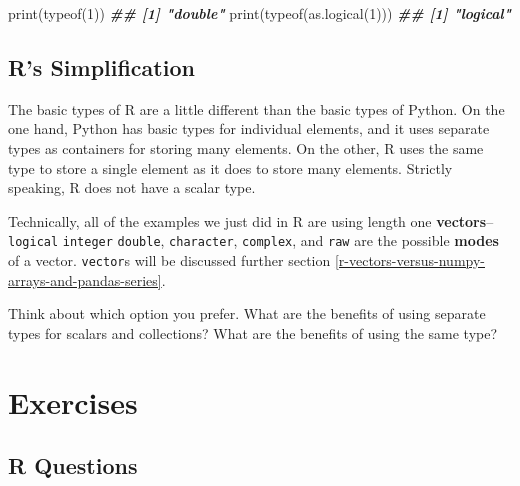 \documentclass[
  12pt,
  krantz2]{krantz}
\makeatletter
\newenvironment{Shaded}{\begin{snugshade}}{\end{snugshade}}
\newcommand{\DecValTok}[1]{\textcolor[rgb]{0.06,0.06,0.06}{#1}}
\newcommand{\DocumentationTok}[1]{\textcolor[rgb]{0.37,0.37,0.37}{\textbf{\textit{#1}}}}
\newcommand{\FunctionTok}[1]{\textcolor[rgb]{0,0,0}{#1}}
\newcommand{\NormalTok}[1]{#1}
\newenvironment{kframe}{%
\medskip{}
\setlength{\fboxsep}{.8em}
 \def\at@end@of@kframe{}%
 \ifinner\ifhmode%
  \def\at@end@of@kframe{\end{minipage}}%
  \begin{minipage}{\columnwidth}%
 \fi\fi%
 \def\FrameCommand##1{\hskip\@totalleftmargin \hskip-\fboxsep
 \colorbox{shadecolor}{##1}\hskip-\fboxsep
     \hskip-\linewidth \hskip-\@totalleftmargin \hskip\columnwidth}%
 \MakeFramed {\advance\hsize-\width
   \@totalleftmargin\z@ \linewidth\hsize
   \@setminipage}}%
 {\par\unskip\endMakeFramed%
 \at@end@of@kframe}
\renewenvironment{Shaded}{\begin{kframe}}{\end{kframe}}
\makeatother
\begin{document}
\begin{Shaded}
\begin{Highlighting}[]
\FunctionTok{print}\NormalTok{(}\FunctionTok{typeof}\NormalTok{(}\DecValTok{1}\NormalTok{))}
\DocumentationTok{\#\# [1] "double"}
\FunctionTok{print}\NormalTok{(}\FunctionTok{typeof}\NormalTok{(}\FunctionTok{as.logical}\NormalTok{(}\DecValTok{1}\NormalTok{)))}
\DocumentationTok{\#\# [1] "logical"}
\end{Highlighting}
\end{Shaded}

\hypertarget{rs-simplification}{%
\subsection{R's Simplification}\label{rs-simplification}}

The basic types of R are a little different than the basic types of Python. On the one hand, Python has basic types for individual elements, and it uses separate types as containers for storing many elements. On the other, R uses the same type to store a single element as it does to store many elements. Strictly speaking, R does not have a scalar type.

Technically, all of the examples we just did in R are using length one \textbf{vectors}--\texttt{logical} \texttt{integer} \texttt{double}, \texttt{character}, \texttt{complex}, and \texttt{raw} are the possible \textbf{modes} of a vector. \texttt{vector}s will be discussed further section \ref{r-vectors-versus-numpy-arrays-and-pandas-series}.

Think about which option you prefer. What are the benefits of using separate types for scalars and collections? What are the benefits of using the same type?

\hypertarget{exercises}{%
\section{Exercises}\label{exercises}}

\hypertarget{r-questions}{%
\subsection{R Questions}\label{r-questions}}
\end{document}
